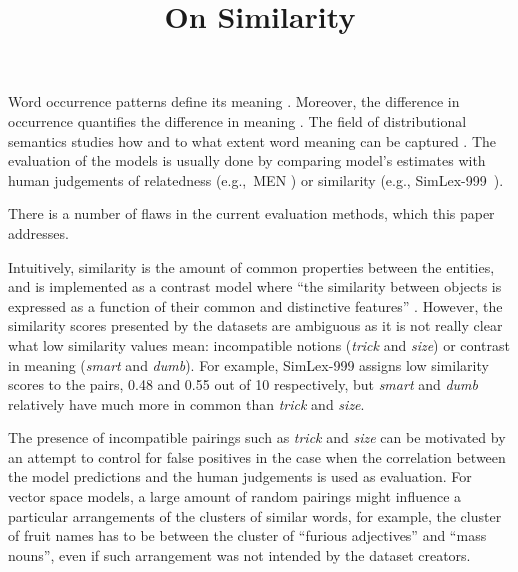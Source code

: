 \documentclass[11pt]{article}
\title{On Similarity}
\date{}
\begin{document}
\maketitle



Word occurrence patterns define its meaning \cite{firth1957lingtheory}. Moreover, the difference in occurrence quantifies the difference in meaning \cite{harris1954distributional}. The field of distributional semantics studies how and to what extent word meaning can be captured \cite{Turney:2010:FMV:1861751.1861756}. The evaluation of the models is usually done by comparing model's estimates with human judgements of relatedness (e.g.,~MEN ) or similarity (e.g., SimLex-999~).

There is a number of flaws in the current evaluation methods, which this paper addresses.

Intuitively, similarity is the amount of common properties between the entities, and is implemented as a contrast model where ``the similarity between objects is expressed as a function of their common and distinctive features'' \cite{Tversky1977}. However, the similarity scores presented by the datasets are ambiguous as it is not really clear what low similarity values mean: incompatible notions (\textit{trick} and \textit{size}) or contrast in meaning (\textit{smart} and \textit{dumb}). For example, SimLex-999 assigns low similarity scores to the pairs, 0.48 and 0.55 out of 10 respectively, but \textit{smart} and \textit{dumb} relatively have much more in common than \textit{trick} and \textit{size}.

The presence of incompatible pairings such as \textit{trick} and \textit{size} can be motivated by an attempt to control for false positives in the case when the correlation between the model predictions and the human judgements is used as evaluation. For vector space models, a large amount of random pairings\footnotemark{} might influence a particular arrangements of the clusters of similar words, for example, the cluster of fruit names has to be between the cluster of ``furious adjectives'' and ``mass nouns'', even if such arrangement was not intended by the dataset creators.
\end{document}
